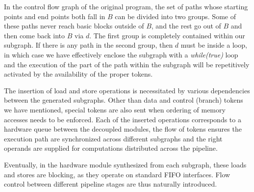 In the control flow graph of the original program, the set of paths whose starting points and end points both fall in $B$ can be divided into
two groups. Some of these paths never reach basic blocks outside of $B$, and the rest go out of $B$ and then come back into $B$ via $d$. 
The first group
is completely contained within our subgraph.  If there is any path in the second group, then $d$ must be inside a loop, in which case we have effectively enclose the subgraph with a \textit{while(true)} loop and the execution of the part
of the path within the subgraph
will be repetitively activated by the availability of the proper tokens.

The insertion of load and store operations is necessitated by various
dependencies between the generated subgraphs. Other than data and control (branch) tokens we have mentioned, special tokens are also sent when ordering
of memory accesses needs to be enforced. Each of the inserted operations corresponds to a hardware queue between the decoupled modules, the flow of
tokens ensures the execution path are synchronized across different subgraphs
and the right operands are supplied for computations distributed across the
pipeline.

Eventually, in the hardware module synthesized from each subgraph, these loads and stores are blocking, as they operate on standard FIFO interfaces. Flow control between different pipeline stages are thus naturally introduced. 




